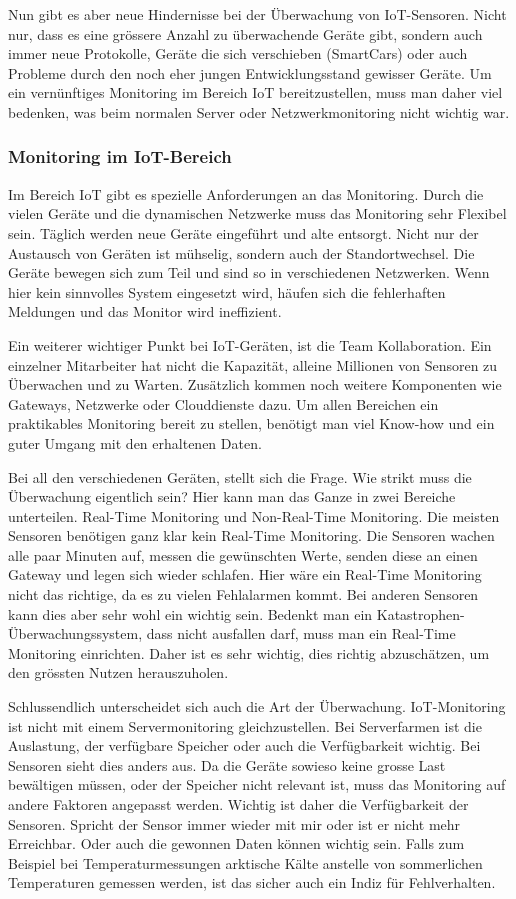 Nun gibt es aber neue Hindernisse bei der Überwachung von IoT-Sensoren. Nicht nur, dass es eine grössere Anzahl zu überwachende Geräte gibt, sondern auch immer neue Protokolle, Geräte die sich verschieben (SmartCars) oder auch Probleme durch den noch eher jungen Entwicklungsstand gewisser Geräte. Um ein vernünftiges Monitoring im Bereich IoT bereitzustellen, muss man daher viel bedenken, was beim normalen Server oder Netzwerkmonitoring nicht wichtig war.
\subsubsection{Monitoring im IoT-Bereich}
Im Bereich IoT gibt es spezielle Anforderungen an das Monitoring. Durch die vielen Geräte und die dynamischen Netzwerke muss das Monitoring sehr Flexibel sein. Täglich werden neue Geräte eingeführt und alte entsorgt. Nicht nur der Austausch von Geräten ist mühselig, sondern auch der Standortwechsel. Die Geräte bewegen sich zum Teil und sind so in verschiedenen Netzwerken. Wenn hier kein sinnvolles System eingesetzt wird, häufen sich die fehlerhaften Meldungen und das Monitor wird ineffizient.

Ein weiterer wichtiger Punkt bei IoT-Geräten, ist die Team Kollaboration. Ein einzelner Mitarbeiter hat nicht die Kapazität, alleine Millionen von Sensoren zu Überwachen und zu Warten. Zusätzlich kommen noch weitere Komponenten wie Gateways, Netzwerke oder Clouddienste dazu. Um allen Bereichen ein praktikables Monitoring bereit zu stellen, benötigt man viel Know-how und ein guter Umgang mit den erhaltenen Daten.

\text Bei all den verschiedenen Geräten, stellt sich die Frage. Wie strikt muss die Überwachung eigentlich sein? Hier kann man das Ganze in zwei Bereiche unterteilen. Real-Time Monitoring und Non-Real-Time Monitoring. Die meisten Sensoren benötigen ganz klar kein Real-Time Monitoring. Die Sensoren wachen alle paar Minuten auf, messen die gewünschten Werte, senden diese an einen Gateway und legen sich wieder schlafen. Hier wäre ein Real-Time Monitoring nicht das richtige, da es zu vielen Fehlalarmen kommt. Bei anderen Sensoren kann dies aber sehr wohl ein wichtig sein. Bedenkt man ein Katastrophen-Überwachungssystem, dass nicht ausfallen darf, muss man ein Real-Time Monitoring einrichten. Daher ist es sehr wichtig, dies richtig abzuschätzen, um den grössten Nutzen herauszuholen.

Schlussendlich unterscheidet sich auch die Art der Überwachung. IoT-Monitoring ist nicht mit einem Servermonitoring gleichzustellen. Bei Serverfarmen ist die Auslastung, der verfügbare Speicher oder auch die Verfügbarkeit wichtig. Bei Sensoren sieht dies anders aus. Da die Geräte sowieso keine grosse Last bewältigen müssen, oder der Speicher nicht relevant ist, muss das Monitoring auf andere Faktoren angepasst werden. Wichtig ist daher die Verfügbarkeit der Sensoren. Spricht der Sensor immer wieder mit mir oder ist er nicht mehr Erreichbar. Oder auch die gewonnen Daten können wichtig sein. Falls zum Beispiel bei Temperaturmessungen arktische Kälte anstelle von sommerlichen Temperaturen gemessen werden, ist das sicher auch ein Indiz für Fehlverhalten.\cite{MonTypes}
